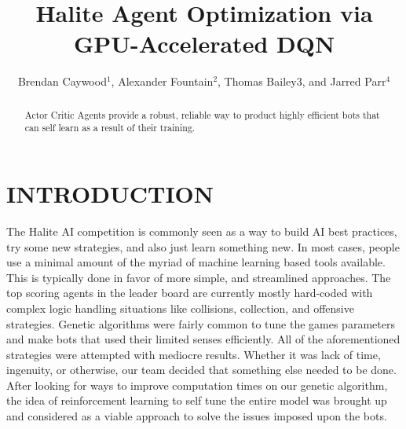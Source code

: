 \documentclass[letterpaper, 11 pt, conference]{ieeeconf}
\title{\LARGE \bf
Halite Agent Optimization via GPU-Accelerated DQN
}
\author{Brendan Caywood$^{1}$, Alexander Fountain$^{2}$, Thomas Bailey${3}$, and Jarred Parr$^{4}$%
}
\begin{document}
\maketitle
\thispagestyle{empty}
\pagestyle{empty}


\begin{abstract}
Actor Critic Agents provide a robust, reliable way to product highly efficient bots that can self learn as a result of their training.
\end{abstract}

\section{INTRODUCTION}

The Halite AI competition is commonly seen as a way to build AI best practices, try some new strategies, and also just learn something new. In most cases, people use a minimal amount of the myriad of machine learning based tools available. This is typically done in favor of more simple, and streamlined approaches. The top scoring agents in the leader board are currently mostly hard-coded with complex logic handling situations like collisions, collection, and offensive strategies. Genetic algorithms were fairly common to tune the games parameters and make bots that used their limited senses efficiently. All of the aforementioned strategies were attempted with mediocre results. Whether it was lack of time, ingenuity, or otherwise, our team decided that something else needed to be done. After looking for ways to improve computation times on our genetic algorithm, the idea of reinforcement learning to self tune the entire model was brought up and considered as a viable approach to solve the issues imposed upon the bots.
\end{document}
